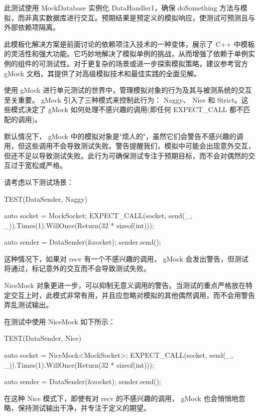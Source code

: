此测试使用 MockDatabase 实例化 DataHandler1，确保 doSomething 方法与模拟，而非真实数据库进行交互。预期结果是预定义的模拟响应，使测试可预测且与外部依赖项隔离。

此模板化解决方案是前面讨论的依赖项注入技术的一种变体，展示了 C++ 中模板的灵活性和强大功能。它巧妙地解决了模拟单例的挑战，从而增强了依赖于单例实例的组件的可测试性。对于更复杂的场景或进一步探索模拟策略，建议参考官方 gMock 文档，其提供了对高级模拟技术和最佳实践的全面见解。


使用 gMock 进行单元测试的世界中，管理模拟对象的行为及其与被测系统的交互至关重要。 gMock 引入了三种模式来控制此行为： Naggy、 Nice 和 Strict。这些模式决定了 gMock 如何处理不感兴趣的调用(即任何 EXPECT\_CALL 都不匹配的调用)。


默认情况下， gMock 中的模拟对象是"烦人的"，虽然它们会警告不感兴趣的调用，但这些调用不会导致测试失败。警告提醒我们，模拟中可能会出现意外交互，但还不足以导致测试失败。此行为可确保测试专注于预期目标，而不会对偶然的交互过于宽松或严格。

请考虑以下测试场景：

\begin{cpp}
TEST(DataSender, Naggy) {
    auto socket = MockSocket{};
    EXPECT_CALL(socket, send(_, _)).Times(1).WillOnce(Return(32 * sizeof(int)));

    auto sender = DataSender(&socket);
    sender.send();
}
\end{cpp}

这种情况下，如果对 recv 有一个不感兴趣的调用， gMock 会发出警告，但测试将通过，标记意外的交互而不会导致测试失败。


NiceMock 对象更进一步，可以抑制无意义调用的警告。当测试的重点严格放在特定交互上时，此模式非常有用，并且应忽略对模拟的其他偶然调用，而不会用警告弄乱测试输出。

在测试中使用 NiceMock 如下所示：

\begin{cpp}
TEST(DataSender, Nice) {
    auto socket = NiceMock<MockSocket>{};
    EXPECT_CALL(socket, send(_, _)).Times(1).WillOnce(Return(32 * sizeof(int)));

    auto sender = DataSender(&socket);
    sender.send();
}
\end{cpp}

在这种 Nice 模式下，即使有对 recv 的不感兴趣的调用， gMock 也会悄悄地忽略，保持测试输出干净，并专注于定义的期望。

